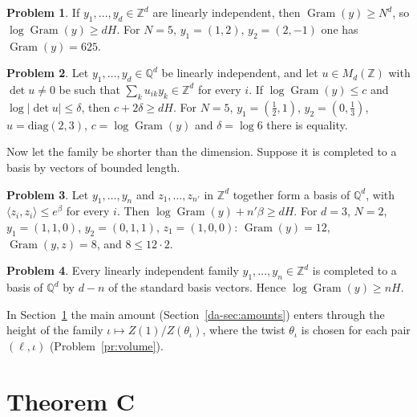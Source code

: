 \documentclass[reqno]{amsart}
\theoremstyle{definition}
\newtheorem{problem}{Problem}[section]
\theoremstyle{plain}
\newcommand{\Z}{{\mathbb{Z}}}
\newcommand{\Q}{{\mathbb{Q}}}
\newcommand{\Gram}{\operatorname{Gram}}
\begin{document}
\begin{problem}\label{pr:toy-int}
If \(y_1, \dots, y_d \in \Z^d\) are linearly independent, then \(\Gram(y) \ge N^d\), so \(\log \Gram(y) \ge dH\).  For \(N = 5\), \(y_1 = (1, 2)\), \(y_2 = (2, -1)\) one has \(\Gram(y) = 625\).
\end{problem}

\begin{problem}\label{pr:toy-index}
Let \(y_1, \dots, y_d \in \Q^d\) be linearly independent, and let \(u \in M_d(\Z)\) with \(\det u \ne 0\) be such that \(\sum_k u_{ik} y_k \in \Z^d\) for every \(i\).  If \(\log \Gram(y) \le c\) and \(\log\lvert\det u\rvert \le \delta\), then \(c + 2\delta \ge dH\).  For \(N = 5\), \(y_1 = (\tfrac12, 1)\), \(y_2 = (0, \tfrac13)\), \(u = \mathrm{diag}(2, 3)\), \(c = \log \Gram(y)\) and \(\delta = \log 6\) there is equality.
\end{problem}

Now let the family be shorter than the dimension.  Suppose it is completed to a basis by vectors of bounded length.

\begin{problem}\label{pr:toy-complete}
Let \(y_1, \dots, y_n\) and \(z_1, \dots, z_{n'}\) in \(\Z^d\) together form a basis of \(\Q^d\), with \(\langle z_i, z_i \rangle \le e^{\beta}\) for every \(i\).  Then \(\log \Gram(y) + n'\beta \ge dH\).  For \(d = 3\), \(N = 2\), \(y_1 = (1, 1, 0)\), \(y_2 = (0, 1, 1)\), \(z_1 = (1, 0, 0)\): \(\Gram(y) = 12\), \(\Gram(y, z) = 8\), and \(8 \le 12 \cdot 2\).
\end{problem}

\begin{problem}\label{pr:toy-steinitz}
Every linearly independent family \(y_1, \dots, y_n \in \Z^d\) is completed to a basis of \(\Q^d\) by \(d - n\) of the standard basis vectors.  Hence \(\log \Gram(y) \ge nH\).
\end{problem}

In Section~\ref{sec:thmC} the main amount (Section~\ref{da-sec:amounts}) enters through the height of the family \(\iota \mapsto Z(1)/Z(\theta_\iota)\), where the twist \(\theta_\iota\) is chosen for each pair \((\ell, \iota)\) (Problem~\ref{pr:volume}).

\section{Theorem C}\label{sec:thmC}
\end{document}
